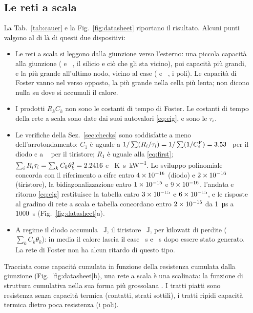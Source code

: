 \documentclass[10pt,a4paper]{scrartcl}
\let\newcommand\fcitdefine
\newcommand{\JK}{\si{\joule\per\kelvin}}
\begin{document}
\subsection{Le reti a scala}
La Tab.~\ref{tab:cauer} e la Fig.~\ref{fig:datasheet} riportano il risultato. Alcuni punti valgono al di là di questi due dispositivi:
\begin{itemize}
\item Le reti a scala si leggono dalla giunzione verso l'esterno: una piccola capacità alla giunzione (\fcddCcA{} e \fcdtCcA~\JK, il silicio e ciò che gli sta vicino), poi capacità più grandi, e la più grande all'ultimo nodo, vicino al case (\fcddCcD{} e \fcdtCcD~\JK, i poli). Le capacità di Foster vanno nel verso opposto, la più grande nella cella più lenta; non dicono nulla su dove si accumuli il calore.
\item I prodotti $R_kC_k$ non sono le costanti di tempo di Foster. Le costanti di tempo della rete a scala sono date dai suoi autovalori \eqref{eq:eig}, e sono le $\tau_i$.
\item Le verifiche della Sez.~\ref{sec:checks} sono soddisfatte a meno dell'arrotondamento: $C_1$ è uguale a $1/\sum (R_i/\tau_i) = 1/\sum(1/C^\mathrm{F}_i) = 3.53$~\JK{} per il diodo e a \fcdtCfSeries~\JK{} per il tiristore; $R_1$ è uguale alla \eqref{eq:first}; $\sum_i R_i\tau_i = \sum_k C_k\theta_k^2 = 2.2416$ e \fcdtMone~\si{\kelvin\second\per\kilo\watt}. Lo sviluppo polinomiale concorda con il riferimento a \fcmpDigits{} cifre entro $4\times 10^{-16}$ (diodo) e $2\times 10^{-16}$ (tiristore), la bidiagonalizzazione entro $1\times 10^{-15}$ e $9\times 10^{-16}$, l'andata e ritorno \eqref{eq:eig} restituisce la tabella entro $3\times 10^{-15}$ e $6\times 10^{-15}$, e le risposte al gradino di rete a scala e tabella concordano entro $2\times 10^{-15}$ da \SI{1}{\micro\second} a \SI{1000}{\second} (Fig.~\ref{fig:datasheet}a).
\item A regime il diodo accumula \fcddStored~J, il tiristore \fcdtStored~J, per kilowatt di perdite ($\sum_k C_k\theta_k$): in media il calore lascia il case \fcddDelay~s e \fcdtDelay~s dopo essere stato generato. La rete di Foster non ha alcun ritardo di questo tipo.
\end{itemize}
Tracciata come capacità cumulata in funzione della resistenza cumulata dalla giunzione (Fig.~\ref{fig:datasheet}b), una rete a scala è una scalinata: la funzione di struttura cumulativa nella sua forma più grossolana \cite{szekely1988,szekely1997}. I tratti piatti sono resistenza senza capacità termica (contatti, strati sottili), i tratti ripidi capacità termica dietro poca resistenza (i poli).
\end{document}
